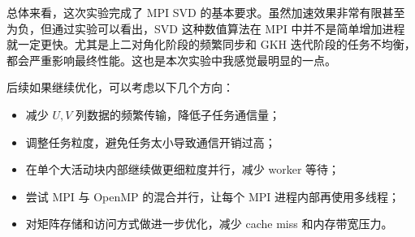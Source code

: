 \documentclass[UTF8,a4paper,12pt]{ctexart}
\begin{document}
总体来看，这次实验完成了 MPI SVD 的基本要求。虽然加速效果非常有限甚至为负，但通过实验可以看出，SVD 这种数值算法在 MPI 中并不是简单增加进程就一定更快。尤其是上二对角化阶段的频繁同步和 GKH 迭代阶段的任务不均衡，都会严重影响最终性能。这也是本次实验中我感觉最明显的一点。

后续如果继续优化，可以考虑以下几个方向：
\begin{itemize}
  \item 减少 $U,V$ 列数据的频繁传输，降低子任务通信量；
  \item 调整任务粒度，避免任务太小导致通信开销过高；
  \item 在单个大活动块内部继续做更细粒度并行，减少 worker 等待；
  \item 尝试 MPI 与 OpenMP 的混合并行，让每个 MPI 进程内部再使用多线程；
  \item 对矩阵存储和访问方式做进一步优化，减少 cache miss 和内存带宽压力。
\end{itemize}
\end{document}
